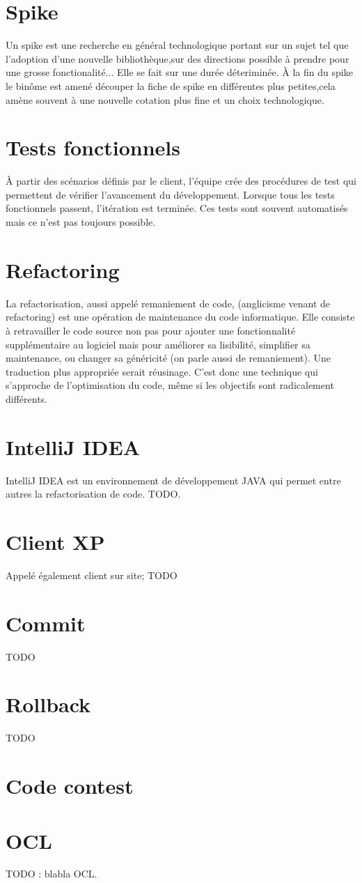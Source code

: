 \section{Spike}
Un spike est une recherche en général technologique portant sur un sujet tel que l'adoption d'une nouvelle bibliothèque,sur des directions possible à prendre pour une grosse fonctionalité... Elle se fait sur une durée déteriminée. À la fin du spike le binôme est amené découper la fiche de spike en différentes plus petites,cela amène souvent à une nouvelle cotation plus fine et un choix technologique.

\section{Tests fonctionnels}\label{lexique:testsFonctionnels}
À partir des scénarios définis par le client, l'équipe crée des procédures de test qui permettent de vérifier l'avancement du développement. Lorsque tous les tests fonctionnels passent, l'itération est terminée. Ces tests sont souvent automatisés mais ce n'est pas toujours possible.

\section{Refactoring}\label{lexique:refactoring}
La refactorisation, aussi appelé remaniement de code, (anglicisme venant de refactoring) est une opération de maintenance du code informatique. Elle consiste à retravailler le code source non pas pour ajouter une fonctionnalité supplémentaire au logiciel mais pour améliorer sa lisibilité, simplifier sa maintenance, ou changer sa généricité (on parle aussi de remaniement). Une traduction plus appropriée serait réusinage. C'est donc une technique qui s'approche de l'optimisation du code, même si les objectifs sont radicalement différents. 

\section{IntelliJ IDEA}\label{lexique:IDEA}
IntelliJ IDEA est un environnement de développement JAVA qui permet entre autres la refactorisation de code.
TODO.
\section{Client XP}\label{lexique:clientXP}
Appelé également client sur site; TODO

\section{Commit}\label{lexique:commit}
TODO

\section{Rollback}\label{lexique:rollback}
TODO

\section{Code contest}\label{lexique:codeContest}

\section{OCL}\label{lexique:OCL}
TODO : blabla OCL.
